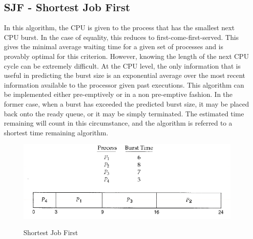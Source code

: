 \documentclass[10pt,a4paper]{article}
\begin{document}
\subsection{SJF - Shortest Job First}
In this algorithm, the CPU is given to the process that has the smallest next CPU burst. In the case of equality, this reduces to first-come-first-served. This gives the minimal average waiting time for a given set of processes and is provably optimal for this criterion. However, knowing the length of the next CPU cycle can be extremely difficult. At the CPU level, the only information that is useful in predicting the burst size is an exponential average over the most recent information available to the processor given past executions. This algorithm can be implemented either pre-emptively or in a non pre-emptive fashion. In the former case, when a burst has exceeded the predicted burst size, it may be placed back onto the ready queue, or it may be simply terminated. The estimated time remaining will count in this circumstance, and the algorithm is referred to a shortest time remaining algorithm.  
\begin{figure}
\caption{Shortest Job First \cite{OSCONCEPTS}}
\begin{center}
\includegraphics[scale=0.45]{../images/sjf-sched.png}
\label{fcfs}
\end{center}
\end{figure}
\end{document}
